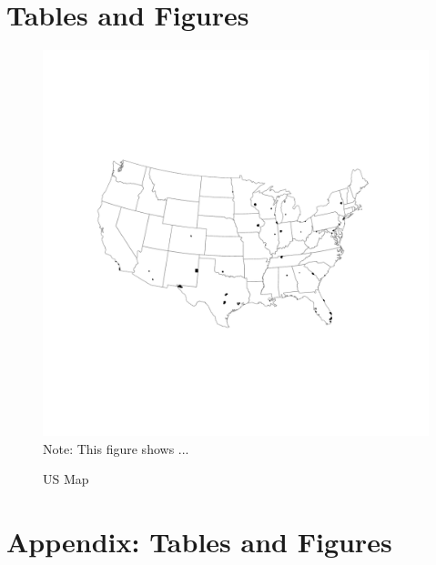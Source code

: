 \documentclass[12pt,a4paper,onecolumn]{article}
\begin{document}

\pagebreak
\singlespacing

\pagebreak


\section*{Tables and Figures}


%

\pagebreak

\begin{figure}[H]
\caption{US Map} \label{fig:robust}
    \includegraphics[scale=0.75]{../views/fig1a.pdf}   
 \flushleft
 Note: This figure shows ...
\end{figure}

\pagebreak
\appendix
\renewcommand{\theequation}{\Alph{chapter}.\arabic{equation}}

\setcounter{figure}{0}
\setcounter{table}{0}
\makeatletter 
\renewcommand{\thefigure}{A.\@arabic\c@figure}
\renewcommand{\thetable}{A.\@arabic\c@table}

\section{Appendix: Tables and Figures}\label{sec:appendix_tables} 
\end{document}
